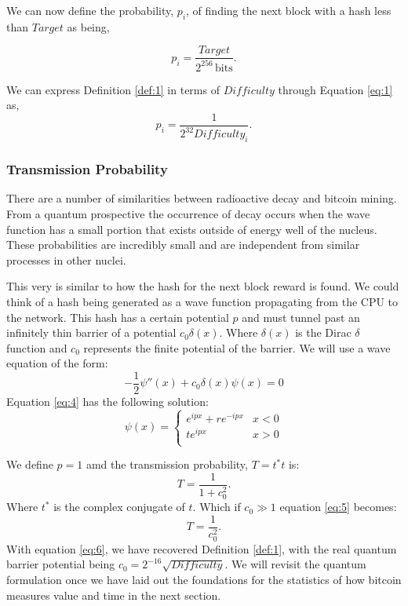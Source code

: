 \documentclass[runningheads]{llncs}
\begin{document}
We can now define the probability, $p_i$, of finding the next block with a hash less than $Target$ as being,
\begin{definition} \label{def:1}
    \begin{equation}
        p_i = \frac{Target}{2^{256}\,\mathrm{bits}}.
    \end{equation}
\end{definition}

We can express Definition \ref{def:1} in terms of $Difficulty$ through Equation \ref{eq:1} as,
\begin{equation}
    p_i = \frac{1}{2^{32}Difficulty_i}. \label{eq:3}
\end{equation}

\subsubsection{Transmission Probability}
There are a number of similarities between radioactive decay and bitcoin mining.
From a quantum prospective the occurrence of decay occurs when the wave function has a small portion that exists outside of energy well of the nucleus.
These probabilities are incredibly small and are independent from similar processes in other nuclei.

This very is similar to how the hash for the next block reward is found.
We could think of a hash being generated as a wave function propagating from the CPU to the network.
This hash has a certain potential $p$ and must tunnel past an infinitely thin barrier of a potential $c_0 \delta(x)$.
Where $\delta(x)$ is the Dirac $\delta$ function and $c_0$ represents the finite potential of the barrier.
We will use a wave equation of the form:
\begin{equation}
    -\frac{1}{2}\psi''(x) + c_0 \delta(x) \psi(x) = 0 \label{eq:4}
\end{equation}
Equation \ref{eq:4} has the following solution:
\begin{equation}
    \psi(x) =\left\{
    \begin{array}{ll}
        e^{i p x} + r e^{-i p x} & x < 0 \\
        t e^{i p x}              & x > 0 \\
    \end{array}
    \right.
\end{equation}

We define $p = 1$ amd the transmission probability, $T = t^*t$ is:
\begin{equation}
    T = \frac{1}{1 + c_0^2}. \label{eq:5}
\end{equation}
Where $t^*$ is the complex conjugate of $t$.
Which if $c_0 \gg 1$ equation \ref{eq:5} becomes:
\begin{equation}
    T = \frac{1}{c_0^2}. \label{eq:6}
\end{equation}
With equation \ref{eq:6}, we have recovered Definition \ref{def:1}, with the real quantum barrier potential being $c_0 = 2^{-16}\sqrt{Difficulty}$.
We will revisit the quantum formulation once we have laid out the foundations for the statistics of how bitcoin measures value and time in the next section.
\end{document}
